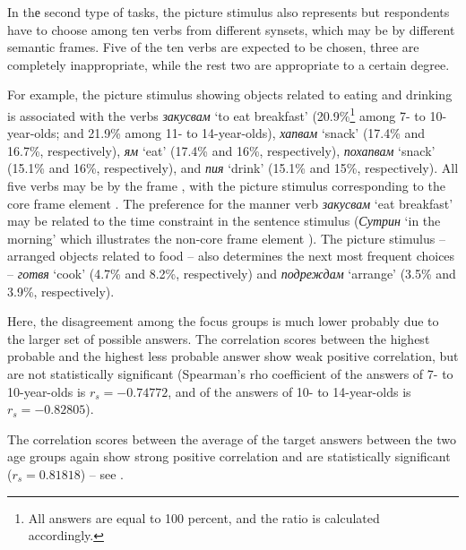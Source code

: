 \documentclass[output=paper,colorlinks,citecolor=brown]{langscibook}
\begin{document}
In thе second type of tasks, the picture stimulus also represents  but respondents have to choose among ten verbs from different synsets, which may be  by different semantic frames. Five of the ten verbs are expected to be chosen, three are completely inappropriate, while the rest two are appropriate to a certain degree. 

For example, the picture stimulus showing objects related to eating and drinking is associated with the verbs \textit{закусвам} `to eat breakfast' (20.9\%\footnote{All answers are equal to 100 percent, and the ratio is calculated accordingly.}  among 7- to 10-year-olds; and 21.9\% among 11- to 14-year-olds), \textit{хапвам} `snack' (17.4\% and 16.7\%, respectively), \textit{ям} `eat' (17.4\% and 16\%, respectively), \textit{похапвам} `snack' (15.1\% and 16\%, respectively), and \textit{пия} `drink' (15.1\% and 15\%, respectively). All five verbs may be  by the frame , with the picture stimulus corresponding to the core frame element . The preference for the manner verb \textit{закусвам} `eat breakfast' may be related to the time constraint in the sentence stimulus (\textit{Сутрин} `in the morning' which illustrates the non-core frame element ). The picture stimulus -- arranged objects related to food -- also determines the next most frequent choices -- \textit{готвя} `cook' (4.7\% and 8.2\%, respectively) and \textit{подреждам} `arrange' (3.5\% and 3.9\%, respectively). 

Here, the disagreement among the focus groups is much lower probably due to the larger set of possible answers. The correlation scores between the highest probable and the highest less probable answer show weak positive correlation, but are not statistically significant (Spearman’s rho coefficient of the answers of 7- to 10-year-olds is $r_s = -0.74772$, and of the answers of 10- to 14-year-olds is $r_s = -0.82805$). 


The correlation scores between the average of the target answers between the two age groups again show strong positive correlation and are statistically significant ($r_s =0.81818$) -- see .
\end{document}
